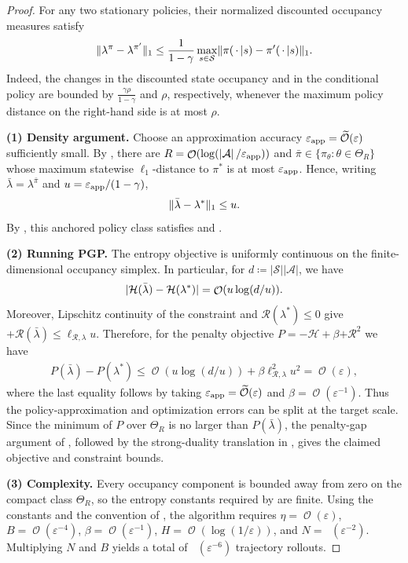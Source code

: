 \documentclass{article}
\theoremstyle{plain}
\theoremstyle{definition}
\theoremstyle{remark}
\def\SS{{\mathcal{S}}}
\def\AA{{\mathcal{A}}}
\DeclareMathOperator{\OOTildeSym}{\widetilde{\mathcal{O}}}
\DeclareMathOperator{\OOSym}{\mathcal{O}}
\newcommand{\OOTilde}[1]{{\OOTildeSym\!\left(#1\right)}}
\newcommand{\OO}[1]{{\OOSym\!\left(#1\right)}}
\newcommand{\card}[1]{\left|#1\right|}
\def\epsilon{{\varepsilon}}
\newcommand{\innerEmpty}{\,\cdot\,}
\DeclarePairedDelimiter{\abs}{\lvert}{\rvert}
\DeclarePairedDelimiter{\norm}{\lVert}{\rVert}
\DeclarePairedDelimiter{\plus}{[}{]_{+}}
\newcommand{\pen}[1]{{\plus{#1}^2}}
\newcommand{\define}{\coloneqq}
\def\ss{{s}}
\def\HH{{\mathcal{H}}}
\newcommand{\algo}{PGP}
\def\ss{{s}}
\def\Reg{{\mathcal{R}}}
\begin{document}
\begin{proof}
 For any two stationary policies, their normalized discounted
 occupancy measures satisfy
 \begin{align*}
  {\norm{\lambda^\pi-\lambda^{\pi^\prime}}_1
   \leq\frac{1}{1-\gamma}
   \max_{\ss\in\SS}
   \norm{\pi(\innerEmpty{}\vert\ss)
    -\pi^\prime(\innerEmpty{}\vert\ss)}_1.}
 \end{align*}
 Indeed, the changes in the discounted state occupancy and in the
 conditional policy are bounded by
 $\frac{\gamma\rho}{1-\gamma}$ and $\rho$, respectively, whenever the maximum
 policy distance on the right-hand side is at most $\rho$.

 \textbf{(1) Density argument.}
 Choose an approximation accuracy
 $\epsilon_{\rm app}=\OOTilde{\epsilon}$ sufficiently small. By
 , there are
 $R=\OO{\log(\card{\AA}/\epsilon_{\rm app})}$ and
 $\bar\pi\in\{\pi_\theta:\theta\in\Theta_R\}$ whose maximum statewise
 $\ell_1$-distance to $\pi^*$ is at most $\epsilon_{\rm app}$. Hence,
 writing $\bar\lambda=\lambda^{\bar\pi}$ and
 $u=\epsilon_{\rm app}/(1-\gamma)$,
 \begin{align*}
  {\norm{\bar\lambda-\lambda^*}_1\leq u.}
 \end{align*}
 By , this anchored
 policy class satisfies  and
 .

 \textbf{(2) Running \algo{}.}
 The entropy objective is uniformly continuous on the finite-dimensional
 occupancy simplex. In particular, for
 $d\define\card{\SS}\card{\AA}$, we have
 \begin{align*}
  \abs{\HH(\bar\lambda)-\HH(\lambda^*)}
  =\OO{u\log(d/u)}.
 \end{align*}
 Moreover, Lipschitz continuity of the constraint and
 $\Reg(\lambda^*)\leq0$ give
 $\plus{\Reg(\bar\lambda)}\leq\ell_{\Reg,\lambda}u$. Therefore, for the
 penalty objective $P=-\HH+\beta\pen{\Reg}$ we have
 \begin{align*}
  P(\bar\lambda)-P(\lambda^*)
  \leq\OO{u\log(d/u)}
  +\beta\ell_{\Reg,\lambda}^2u^2
  =\OO{\epsilon},
 \end{align*}
 where the last equality follows by taking
 $\epsilon_{\rm app}=\OOTilde{\epsilon}$ and
 $\beta=\OO{\epsilon^{-1}}$. Thus the policy-approximation and optimization
 errors can be split at the target scale. Since the minimum of $P$ over
 $\Theta_R$ is no larger than $P(\bar\lambda)$, the penalty-gap argument of
 , followed by the strong-duality translation in
 , gives the claimed objective and constraint
 bounds.

 \textbf{(3) Complexity.}
 Every occupancy component is bounded away from zero on the compact class
 $\Theta_R$, so the entropy constants required by
  are finite. Using the constants and the convention
 of , the algorithm requires
 $\eta=\OO{\epsilon}$, $B=\OO{\epsilon^{-4}}$,
 $\beta=\OO{\epsilon^{-1}}$, $H=\OO{\log(1/\epsilon)}$, and
 $N=\OOTilde{\epsilon^{-2}}$. Multiplying $N$ and $B$ yields
 a total of $\OOTilde{\epsilon^{-6}}$ trajectory rollouts.
\end{proof}
\end{document}
